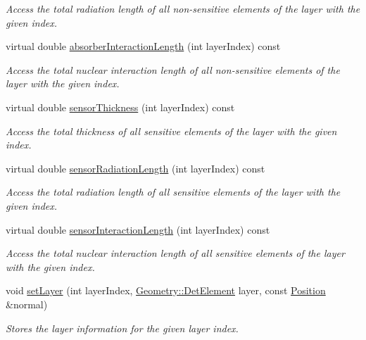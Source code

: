 \begin{DoxyCompactItemize}
\begin{DoxyCompactList}\small\item\em Access the total radiation length of all non-\/sensitive elements of the layer with the given index. \item\end{DoxyCompactList}\item 
virtual double \hyperlink{class_d_d4hep_1_1_d_d_rec_1_1_layering_extension_impl_ac30e3e0b49ca4f79c5ccd173dcfc669e}{absorberInteractionLength} (int layerIndex) const 
\begin{DoxyCompactList}\small\item\em Access the total nuclear interaction length of all non-\/sensitive elements of the layer with the given index. \item\end{DoxyCompactList}\item 
virtual double \hyperlink{class_d_d4hep_1_1_d_d_rec_1_1_layering_extension_impl_adb4ae56a651abfa1758201c6562e2ee0}{sensorThickness} (int layerIndex) const 
\begin{DoxyCompactList}\small\item\em Access the total thickness of all sensitive elements of the layer with the given index. \item\end{DoxyCompactList}\item 
virtual double \hyperlink{class_d_d4hep_1_1_d_d_rec_1_1_layering_extension_impl_a50cbe11650ef7283353a6ba6a4f564e7}{sensorRadiationLength} (int layerIndex) const 
\begin{DoxyCompactList}\small\item\em Access the total radiation length of all sensitive elements of the layer with the given index. \item\end{DoxyCompactList}\item 
virtual double \hyperlink{class_d_d4hep_1_1_d_d_rec_1_1_layering_extension_impl_a8746d049cc1aac662e60a1e72496f2e7}{sensorInteractionLength} (int layerIndex) const 
\begin{DoxyCompactList}\small\item\em Access the total nuclear interaction length of all sensitive elements of the layer with the given index. \item\end{DoxyCompactList}\item 
void \hyperlink{class_d_d4hep_1_1_d_d_rec_1_1_layering_extension_impl_a75921469ae3156903c1468cda59ce4cf}{setLayer} (int layerIndex, \hyperlink{class_d_d4hep_1_1_geometry_1_1_det_element}{Geometry::DetElement} layer, const \hyperlink{class_d_d4hep_1_1_d_d_rec_1_1_layering_extension_impl_a34281f7585bbe0d61654c9924e2789e3}{Position} \&normal)
\begin{DoxyCompactList}\small\item\em Stores the layer information for the given layer index. \item\end{DoxyCompactList}\end{DoxyCompactItemize}
